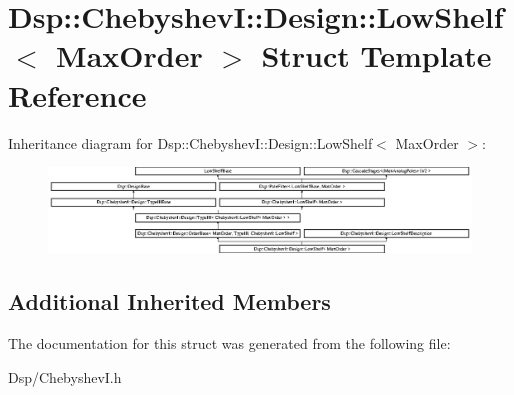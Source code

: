 \hypertarget{structDsp_1_1ChebyshevI_1_1Design_1_1LowShelf}{\section{Dsp\-:\-:Chebyshev\-I\-:\-:Design\-:\-:Low\-Shelf$<$ Max\-Order $>$ Struct Template Reference}
\label{structDsp_1_1ChebyshevI_1_1Design_1_1LowShelf}
}
Inheritance diagram for Dsp\-:\-:Chebyshev\-I\-:\-:Design\-:\-:Low\-Shelf$<$ Max\-Order $>$\-:\begin{figure}[H]
\begin{center}
\leavevmode
\includegraphics[height=2.285714cm]{structDsp_1_1ChebyshevI_1_1Design_1_1LowShelf}
\end{center}
\end{figure}
\subsection*{Additional Inherited Members}


The documentation for this struct was generated from the following file\-:\begin{DoxyCompactItemize}
\item 
Dsp/Chebyshev\-I.\-h\end{DoxyCompactItemize}
